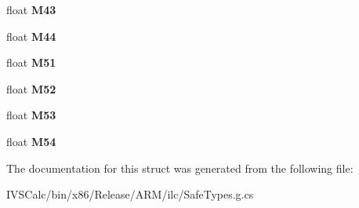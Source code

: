 \begin{DoxyCompactItemize}
float {\bfseries M43}
\item 
\mbox{\label{struct_microsoft_1_1_graphics_1_1_canvas_1_1_effects_1_1_matrix5x4_a9063160eac2f48c0d9278a0c027febc1}} 
float {\bfseries M44}
\item 
\mbox{\label{struct_microsoft_1_1_graphics_1_1_canvas_1_1_effects_1_1_matrix5x4_a7fb2fad1acb5a0d6dfedb28af0f3f59d}} 
float {\bfseries M51}
\item 
\mbox{\label{struct_microsoft_1_1_graphics_1_1_canvas_1_1_effects_1_1_matrix5x4_ab485bef1086d01434057aa3b6c4d3e70}} 
float {\bfseries M52}
\item 
\mbox{\label{struct_microsoft_1_1_graphics_1_1_canvas_1_1_effects_1_1_matrix5x4_a04025a6a7d45f4cc240b07766d78d313}} 
float {\bfseries M53}
\item 
\mbox{\label{struct_microsoft_1_1_graphics_1_1_canvas_1_1_effects_1_1_matrix5x4_a0a297ea8d95190ce43e3a4163e04e0cc}} 
float {\bfseries M54}
\end{DoxyCompactItemize}


The documentation for this struct was generated from the following file\+:\begin{DoxyCompactItemize}
\item 
I\+V\+S\+Calc/bin/x86/\+Release/\+A\+R\+M/ilc/Safe\+Types.\+g.\+cs\end{DoxyCompactItemize}
